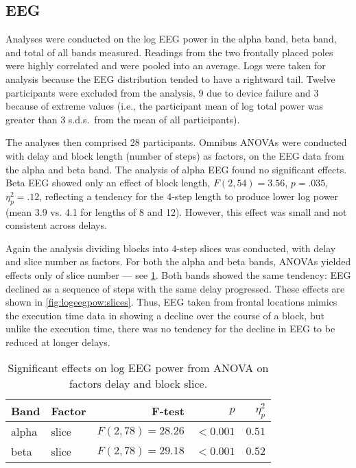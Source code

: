\subsection{EEG}
Analyses were conducted on the log EEG power in the alpha band, beta band, and total of all bands measured.
Readings from the two frontally placed poles were highly correlated and were pooled into an average.
Logs were taken for analysis because the EEG distribution tended to have a rightward tail.
Twelve participants were excluded from the analysis, 9 due to device failure and 3 because of extreme values (i.e., the participant mean of log total power was greater than 3 s.d.s.\ from the mean of all participants).

The analyses then comprised 28 participants.\@
Omnibus ANOVAs were conducted with delay and block length (number of steps) as factors, on the EEG data from the alpha and beta band.
The analysis of alpha EEG found no significant effects.
Beta EEG showed only an effect of block length, \( F(2,54) = 3.56 \), \( p = .035 \), \( \eta^{2}_{p} = .12 \), reflecting a tendency for the 4-step length to produce lower log power (mean 3.9 vs. 4.1 for lengths of 8 and 12).
However, this effect was small and not consistent across delays.  

Again the analysis dividing blocks into 4-step slices was conducted, with delay and slice number as factors.  
For both the alpha and beta bands, ANOVAs  yielded effects only of slice number --- see \cref{tab:anova:egg:alphabeta}.
Both bands showed the same tendency:  EEG declined as a sequence of steps with the same delay progressed.
These effects are shown in \cref{fig:logeegpow:slices}.
Thus, EEG taken from frontal locations mimics the execution time data in showing a decline over the course of a block, but unlike the execution time, there was no tendency for the decline in EEG to be reduced at longer delays.

\begin{table}[h]
  \centering
  \caption{Significant effects on log EEG power from ANOVA on factors delay and block slice.}\label{tab:anova:egg:alphabeta}
  \setlength{\tabcolsep}{0pt} %
  \begin{tabular*}{\columnwidth}{@{\extracolsep{\fill}\quad}llrrr}
    \toprule
    \textbf{Band} & \textbf{Factor} & \textbf{F-test} & \textbf{\(p\)} & \textbf{\( \eta^{2}_{p} \)} \\ \midrule
    alpha   & slice & \( F(2, 78) = 28.26 \) & \( <0.001 \) & \( 0.51 \) \\ %
    beta    & slice & \( F(2, 78) = 29.18 \) & \( <0.001 \) & \( 0.52 \) \\ 
    \bottomrule
  \end{tabular*}
\end{table}

